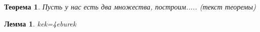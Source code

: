 
\usepackage{setspace}
\usepackage{amsmath}

\DeclareMathOperator{\sinc}{sinc}
\newcommand{\dif}[3]{


\pgfplotstablegetelem{0}{#2}\of#1

\pgfplotstablecreatecol
    [expr={\thisrow{#2} - \pgfplotsretval}]
    {LocalDistance#3}{#1}

\pgfplotstablecreatecol
    [expr={-\thisrow{LocalDistance#3} + \prevrow{LocalDistance#3}}]
    {#3}{#1}

}
\newcommand{\Exp}[1]{
	\exp\left(#1\right)
}
\newcommand{\Sinc}[1]{
	\sinc\left(#1\right)
}
\newcommand{\Sin}[1]{
	\sin\left(#1\right)
}


\newtheorem{theorem}{Теорема}
\newtheorem{lemma}{Лемма}

\def\labauthors{Понур К.А., Сарафанов Ф.Г., Сидоров Д.А.}
\def\labgroup{420}
\def\labnumber{320}
\def\labtheme{Дифракций Фраунгофера}
\renewcommand{\vec}{\mathbf}
\renewcommand{\Re}{\operatorname{Re}}
\renewcommand{\Im}{\operatorname{Im}}
\renewcommand{\phi}{\varphi}
\renewcommand{\kappa}{\varkappa}
\renewcommand{\hat}{\widehat}

\begin{spacing}{1}
\tableofcontents
\end{spacing}
\newpage
\begin{theorem} \label{t1} %
Пусть у нас есть два множества, построим..... (текст теоремы)
\end{theorem}

\begin{lemma}
kek=4eburek
\end{lemma}
